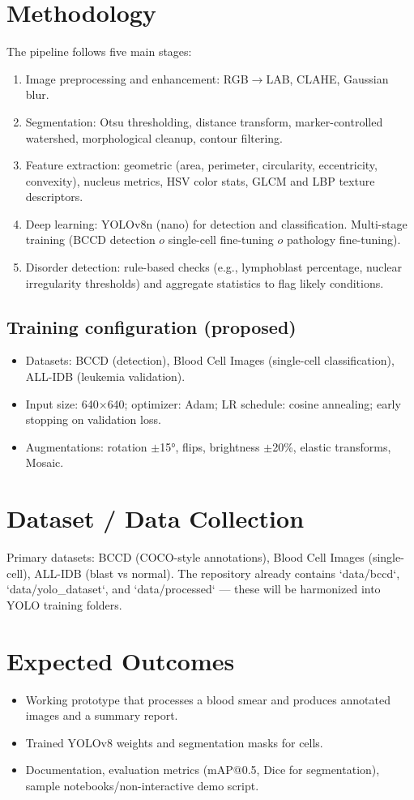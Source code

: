 \documentclass[11pt,a4paper]{article}
\begin{document}
\section{Methodology}
The pipeline follows five main stages:
\begin{enumerate}
  \item Image preprocessing and enhancement: RGB$\to$LAB, CLAHE, Gaussian blur.
  \item Segmentation: Otsu thresholding, distance transform, marker-controlled watershed, morphological cleanup, contour filtering.
  \item Feature extraction: geometric (area, perimeter, circularity, eccentricity, convexity), nucleus metrics, HSV color stats, GLCM and LBP texture descriptors.
  \item Deep learning: YOLOv8n (nano) for detection and classification. Multi-stage training (BCCD detection $	o$ single-cell fine-tuning $	o$ pathology fine-tuning).
  \item Disorder detection: rule-based checks (e.g., lymphoblast percentage, nuclear irregularity thresholds) and aggregate statistics to flag likely conditions.
\end{enumerate}

\subsection{Training configuration (proposed)}
\begin{itemize}
  \item Datasets: BCCD (detection), Blood Cell Images (single-cell classification), ALL-IDB (leukemia validation).
  \item Input size: 640$\times$640; optimizer: Adam; LR schedule: cosine annealing; early stopping on validation loss.
  \item Augmentations: rotation $\pm$15°, flips, brightness $\pm$20\%, elastic transforms, Mosaic.
\end{itemize}

\section{Dataset / Data Collection}
Primary datasets: BCCD (COCO-style annotations), Blood Cell Images (single-cell), ALL-IDB (blast vs normal). The repository already contains `data/bccd`, `data/yolo_dataset`, and `data/processed` — these will be harmonized into YOLO training folders.

\section{Expected Outcomes}
\begin{itemize}
  \item Working prototype that processes a blood smear and produces annotated images and a summary report.
  \item Trained YOLOv8 weights and segmentation masks for cells.
  \item Documentation, evaluation metrics (mAP@0.5, Dice for segmentation), sample notebooks/non-interactive demo script.
\end{itemize}
\end{document}
